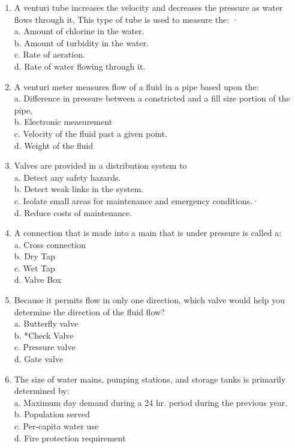 \begin{enumerate}[1.]
\item A venturi tube increases the velocity and decreases the pressure as water flows through it, This type of tube is used to measure the: ·\\
a. Amount of chlorine in the water.\\
b. Amount of turbidity in the water.\\
c. Rate of aeration.\\
d. Rate of water flowing through it.\\

\item A venturi meter measures flow of a fluid in a pipe based upon the:\\
a. Difference in pressure between a constricted and a fill size portion of the pipe,\\
b. Electronic measurement\\
c. Velocity of the fluid past a given point.\\
d. Weight of the fluid\\

\item Valves are provided in a distribution system to\\
a. Detect any safety hazards.\\
b. Detect weak links in the system.\\
c. Isolate small areas for maintenance and emergency conditions.·\\
d. Reduce costs of maintenance.\\

\item A connection that is made into a main that is under pressure is called a:\\
a. Cross connection\\
b. Dry Tap\\
c. Wet Tap\\
d. Valve Box\\

\item  Because it permits flow in only one direction, which valve would help you determine the direction of the fluid flow?\\
a. Butterfly valve\\
b. *Check Valve\\
c. Pressure valve\\
d. Gate valve\\

\item The size of water mains, pumping stations, and storage tanks is primarily
determined by:\\
a. Maximum day demand during a 24 hr. period during the previous year.\\
b. Population served\\
c. Per-capita water use\\
d. Fire protection requirement\\


\end{enumerate}
